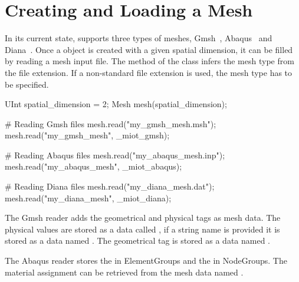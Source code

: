 \section{Creating and Loading a Mesh\label{sect:common:mesh}}

In its current state, \akantu supports three types of meshes, Gmsh~\cite{gmsh},
Abaqus~\cite{abaqus} and Diana~\cite{diana}. Once a  object is
created with a given spatial dimension, it can be filled by reading a mesh input file.
The method  of the class  infers the mesh type from the file extension. If a non-standard file extension is used, the mesh type has to be specified.

\begin{cpp}
   UInt spatial_dimension = 2;
   Mesh mesh(spatial_dimension);
   
   # Reading Gmsh files
   mesh.read("my_gmsh_mesh.msh");
   mesh.read("my_gmsh_mesh", _miot_gmsh);


   # Reading Abaqus files
   mesh.read("my_abaqus_mesh.inp");
   mesh.read("my_abaqus_mesh", _miot_abaqus);

   # Reading Diana files
   mesh.read("my_diana_mesh.dat");
   mesh.read("my_diana_mesh", _miot_diana);

\end{cpp}

The Gmsh reader adds the geometrical and physical tags as mesh data. The physical
values are stored as a  data called , if a string
name is provided it is stored as a  data named
. The geometrical tag is stored as a  data named
.


The Abaqus reader stores the  in ElementGroups and the 
in NodeGroups. The material assignment can be retrieved from the
 mesh data named .


